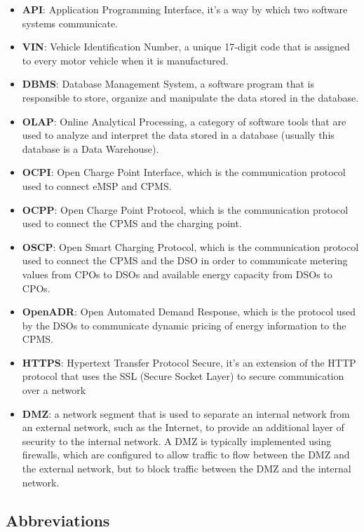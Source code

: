 \documentclass{Configuration_Files/PoliMi3i_thesis}
\begin{document}
\begin{itemize}
    \item \textbf{API}: Application Programming Interface, it's a way by which two software systems communicate.
    \item \textbf{VIN}: Vehicle Identification Number, a unique 17-digit code that is assigned to every motor vehicle when it is manufactured.
    \item \textbf{DBMS}: Database Management System, a software program that is responsible to store, organize and manipulate the data stored in the database.
    \item \textbf{OLAP}: Online Analytical Processing, a category of software tools that are used to analyze and interpret the data stored in a database (usually this database is a Data Warehouse).
    \item \textbf{OCPI}: Open Charge Point Interface, which is the communication protocol used to connect eMSP and CPMS.
    \item \textbf{OCPP}: Open Charge Point Protocol, which is the communication protocol used to connect the CPMS and the charging point.
    \item \textbf{OSCP}: Open Smart Charging Protocol, which is the communication protocol used to connect the CPMS and the DSO in order to communicate metering values from CPOs to DSOs and available energy capacity from DSOs to CPOs.
    \item \textbf{OpenADR}: Open Automated Demand Response, which is the protocol used by the DSOs to communicate dynamic pricing of energy information to the CPMS.
    \item \textbf{HTTPS}: Hypertext Transfer Protocol Secure, it's an extension of the HTTP protocol that uses the SSL (Secure Socket Layer) to secure communication over a network
    \item \textbf{DMZ}: a network segment that is used to separate an internal network from an external network, such as the Internet, to provide an additional layer of security to the internal network. A DMZ is typically implemented using firewalls, which are configured to allow traffic to flow between the DMZ and the external network, but to block traffic between the DMZ and the internal network.
\end{itemize}

\subsection{Abbreviations}
\end{document}
